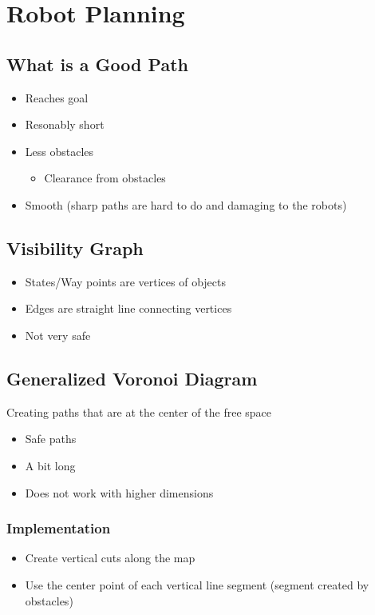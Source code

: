 \section{Robot Planning}

  \subsection{What is a Good Path}

    \begin{itemize}
      \item Reaches goal
      \item Resonably short
      \item Less obstacles
      \begin{itemize}
        \item Clearance from obstacles
      \end{itemize}

      \item Smooth (sharp paths are hard to do and damaging to the robots)
    \end{itemize}

  \subsection{Visibility Graph}

    \begin{itemize}
      \item States/Way points are vertices of objects
      \item Edges are straight line connecting vertices
      \item Not very safe
    \end{itemize}

  \subsection{Generalized Voronoi Diagram}

    Creating paths that are at the center of the free space

    \begin{itemize}
      \item Safe paths
      \item A bit long
      \item Does not work with higher dimensions
    \end{itemize}

    \subsubsection{Implementation}

      \begin{itemize}
        \item Create vertical cuts along the map
        \item Use the center point of each vertical line segment
        (segment created by obstacles)
      \end{itemize}

